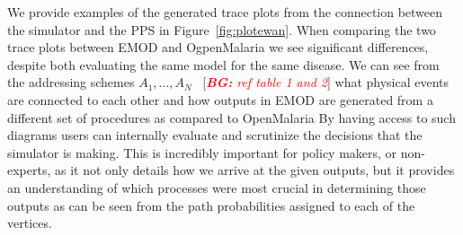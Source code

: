 \documentclass{article}
\newcommand{\bg}[1]{~{{[{\it \textcolor{red}{{\bf BG:} #1}}]}}}
\begin{document}
We provide examples of the generated trace plots from the connection between the simulator and the PPS in Figure~\ref{fig:plotewan}. 
When comparing the two trace plots between EMOD and OgpenMalaria we see significant differences, despite both evaluating the same model for the same disease. 
We can see from the addressing schemes $A_1, \ldots, A_N$ \bg{ref table 1 and 2} what physical events are connected to each other and how outputs in EMOD are generated from a different set of procedures as compared to OpenMalaria 
By having access to such diagrams users can internally evaluate and scrutinize the decisions that the simulator is making.
This is incredibly important for policy makers, or non-experts, as it not only details how we arrive at the given outputs, but it provides an understanding of which processes were most crucial in determining those outputs as can be seen from the path probabilities assigned to each of the vertices.



% 









\end{document}
